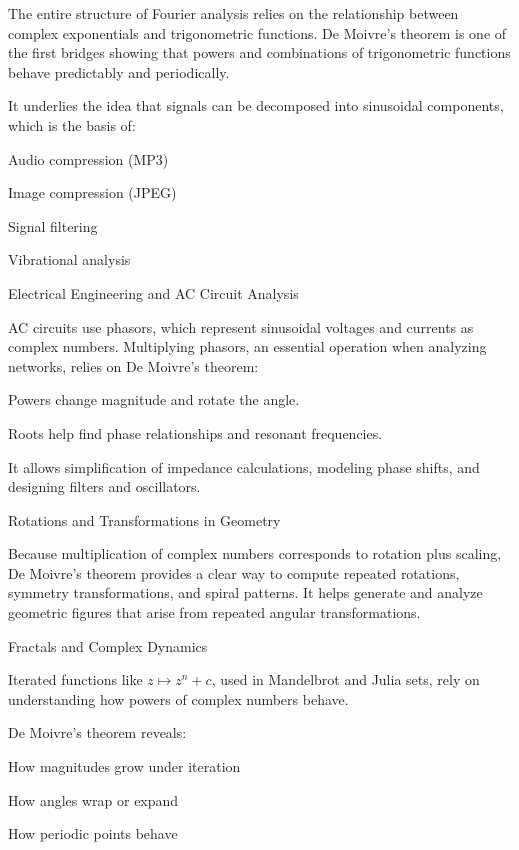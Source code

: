   The entire structure of Fourier analysis relies on the relationship between complex exponentials and
  trigonometric functions. De Moivre’s theorem is one of the first bridges showing that powers and
  combinations of trigonometric functions behave predictably and periodically.

  It underlies the idea that signals can be decomposed into sinusoidal components, which is the basis of:

  \startitemize[i]
\item Audio compression (MP3)
\item Image compression (JPEG)
\item Signal filtering
\item Vibrational analysis
  \stopitemize
\item Electrical Engineering and AC Circuit Analysis

  AC circuits use phasors, which represent sinusoidal voltages and currents as complex numbers. Multiplying
  phasors, an essential operation when analyzing networks, relies on De Moivre’s theorem:

  \startitemize[i]
\item Powers change magnitude and rotate the angle.
\item Roots help find phase relationships and resonant frequencies.
  \stopitemize

  It allows simplification of impedance calculations, modeling phase shifts, and designing filters and
  oscillators.
\item Rotations and Transformations in Geometry

  Because multiplication of complex numbers corresponds to rotation plus scaling, De Moivre’s theorem
  provides a clear way to compute repeated rotations, symmetry transformations, and spiral patterns. It
  helps generate and analyze geometric figures that arise from repeated angular transformations.
\item Fractals and Complex Dynamics

  Iterated functions like $z\mapsto z^n + c$, used in Mandelbrot and Julia sets, rely on understanding how
  powers of complex numbers behave.

  De Moivre’s theorem reveals:

  \startitemize[i]
\item How magnitudes grow under iteration
\item How angles wrap or expand
\item How periodic points behave
  \stopitemize

